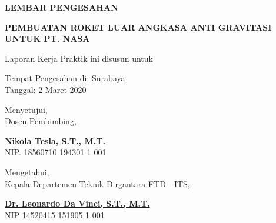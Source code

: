 \begin{center}
  {\Large \textbf{LEMBAR PENGESAHAN}}
  \vspace{6ex}


  {\large \textbf{PEMBUATAN ROKET LUAR ANGKASA ANTI GRAVITASI UNTUK PT. NASA}}
  \vspace{6ex}

  Laporan Kerja Praktik ini disusun untuk \lipsum[1][1]
  \vspace{2ex}

  Tempat Pengesahan di: Surabaya \\
  Tanggal: 2 Maret 2020
  \vspace{8ex}

  Menyetujui, \\
  Dosen Pembimbing,
  \vspace{12ex}

  \textbf{\underline{Nikola Tesla, S.T., M.T.}} \\
  NIP. 18560710 194301 1 001
  \vspace{8ex}

  Mengetahui, \\
  Kepala Departemen Teknik Dirgantara FTD - ITS,
  \vspace{12ex}

  \textbf{\underline{Dr. Leonardo Da Vinci, S.T., M.T.}} \\
  NIP 14520415 151905 1 001

\end{center}